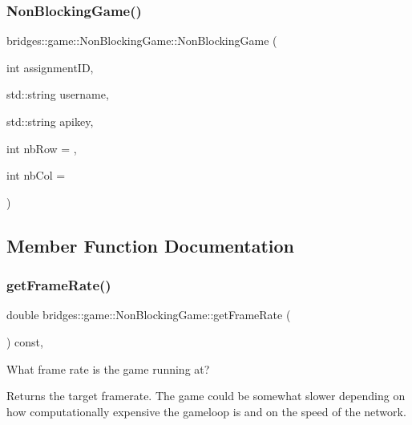 \subsubsection{\texorpdfstring{NonBlockingGame()}{NonBlockingGame()}}
{\footnotesize\ttfamily bridges\+::game\+::\+Non\+Blocking\+Game\+::\+Non\+Blocking\+Game (\begin{DoxyParamCaption}\item[{int}]{assignment\+ID,  }\item[{std\+::string}]{username,  }\item[{std\+::string}]{apikey,  }\item[{int}]{nb\+Row = {},  }\item[{int}]{nb\+Col = {} }\end{DoxyParamCaption})\hspace{0.3cm}{\ttfamily [inline]}}



\subsection{Member Function Documentation}
\mbox{\label{classbridges_1_1game_1_1_non_blocking_game_ab3bee2db9d0d2c4e74ae7943516fb53a}} 
\subsubsection{\texorpdfstring{getFrameRate()}{getFrameRate()}}
{\footnotesize\ttfamily double bridges\+::game\+::\+Non\+Blocking\+Game\+::get\+Frame\+Rate (\begin{DoxyParamCaption}{ }\end{DoxyParamCaption}) const\hspace{0.3cm}{\ttfamily [inline]}, {\ttfamily [protected]}}



What frame rate is the game running at? 

\begin{DoxyReturn}{Returns}
the target framerate. The game could be somewhat slower depending on how computationally expensive the gameloop is and on the speed of the network. 
\end{DoxyReturn}
\mbox{\label{classbridges_1_1game_1_1_non_blocking_game_af88089437e34df580b247cb27047fd14}} 
